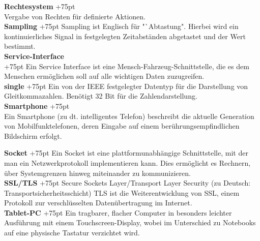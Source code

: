 \documentclass[fontsize = 12pt, paper = a4]{scrreprt}
\begin{document}
\begin{spacing}{0.95}
\textbf{Rechtesystem}
\hangindent+75pt  \\
Vergabe von Rechten für definierte Aktionen.\\

\textbf{Sampling}
\hangindent+75pt  
\hspace*{4.5mm}
Sampling ist Englisch für "`Abtastung". Hierbei wird ein kontinuierliches Signal in festgelegten Zeitabständen abgetastet und der Wert bestimmt.\\

\textbf{Service-Interface} \\
\hangindent+75pt  
Ein Service Interface ist eine Mensch-Fahrzeug-Schnittstelle, die es dem Menschen ermöglichen soll auf alle wichtigen Daten zuzugreifen.\\

\textbf{single}
\hangindent+75pt  
\hspace*{12mm}
Ein von der IEEE festgelegter Datentyp für die Darstellung von Gleitkommazahlen. Benötigt 32 Bit für die Zahlendarstellung. \\

\textbf{Smartphone}
\hangindent+75pt  \\
Ein Smartphone (zu dt. intelligentes Telefon) beschreibt die aktuelle Gene\-ration von Mobilfunktelefonen, deren Eingabe auf einem berührungsempfindlichen Bildschirm erfolgt.\\

\end{spacing}

\textbf{Socket}
\hangindent+75pt 
\hspace*{10mm}
Ein Socket ist eine plattformunabhängige Schnittstelle, mit der man ein Netzwerkprotokoll implementieren kann. Dies ermöglicht es Rechnern, über Systemgrenzen hinweg miteinander zu kommunizieren.\\

\textbf{SSL/TLS}
\hangindent+75pt 
\hspace*{4.5mm}
Secure Sockets Layer/Transport Layer Security (zu Deutsch: Transportsicherheitsschicht) TLS ist die Weiterentwicklung von SSL, einem Protokoll zur verschlüsselten Datenübertragung im Internet.\\

\textbf{Tablet-PC}
\hangindent+75pt  
\hspace*{3mm}
Ein tragbarer, flacher Computer in besonders leichter Ausführung mit einem Touchscreen-Display, wobei im Unterschied zu Notebooks auf eine physische Tastatur verzichtet wird.\\
\end{document}

